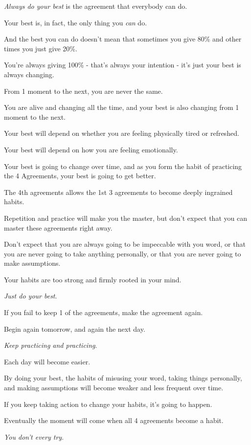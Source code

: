 \documentclass{article}
\numberwithin{equation}{section}
\begin{document}
%
\textit{Always do your best} is the agreement that everybody can do.

Your best is, in fact, the only thing you \textit{can} do.

And the best you can do doesn't mean that sometimes you give 80\% and other times you just give 20\%.

You're always giving 100\% - that's always your intention - it's just your best is always changing.

From 1 moment to the next, you are never the same.

You are alive and changing all the time, and your best is also changing from 1 moment to the next.

%
Your best will depend on whether you are feeling physically tired or refreshed.

Your best will depend on how you are feeling emotionally.

Your best is going to change over time, and as you form the habit of practicing the 4 Agreements, your best is going to get better.

%
The 4th agreements allows the 1st 3 agreements to become deeply ingrained habits.

Repetition and practice will make you the master, but don't expect that you can master these agreements right away.

Don't expect that you are always going to be impeccable with you word, or that you are never going to take anything personally, or that you are never going to make assumptions.

Your habits are too strong and firmly rooted in your mind.

\textit{Just do your best}.

If you fail to keep 1 of the agreements, make the agreement again.

Begin again tomorrow, and again the next day.

\textit{Keep practicing and practicing}.

Each day will become easier.

By doing your best, the habits of misusing your word, taking things personally, and making assumptions will become weaker and less frequent over time.

If you keep taking action to change your habits, it's going to happen.

%
Eventually the moment will come when all 4 agreements become a habit.

\textit{You don't every try}.
\end{document}
